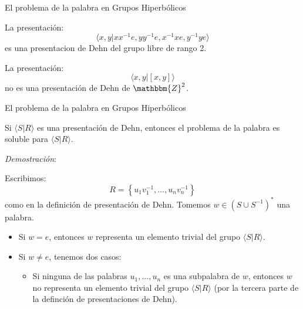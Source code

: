 \documentclass[xcolor=dvipsnames]{beamer}
\theoremstyle{largebreak}
\newcommand{\bbm}[1]{\ensuremath{\mathbbm{#1}}}
\newcommand{\gen}[1]{\ensuremath{\langle#1\rangle}}
\begin{document}
\begin{frame}{El problema de la palabra en Grupos Hiperbólicos}
    \begin{exa}
        La presentación:
        \begin{equation*}
            \gen{x,y|xx^{-1}e,yy^{-1}e,x^{-1}xe,y^{-1}ye}
        \end{equation*}
        es una presentacion de Dehn del grupo libre de rango 2.
    \end{exa}

    \begin{exa}
        La presentación:
        \begin{equation*}
            \gen{x,y|[x,y]}
        \end{equation*}
        no es una presentación de Dehn de $\bbm{Z}^2$.
    \end{exa}
\end{frame}

\begin{frame}{El problema de la palabra en Grupos Hiperbólicos}
    \begin{propo}
        Si $\gen{S|R}$ es una presentación de Dehn, entonces el problema de la palabra es soluble para $\gen{S|R}$.
    \end{propo}
    \textit{Demostración}:

    Escribimos:
    \begin{equation*}
        R=\left\{u_1v_1^{-1},...,u_nv_n^{-1} \right\}
    \end{equation*}
    como en la definición de presentación de Dehn. Tomemos $w\in(S\cup S^{-1})^*$ una palabra.
    \begin{itemize}
        \item Si $w=e$, entonces $w$ representa un elemento trivial del grupo $\gen{S|R}$.
        \item Si $w\neq e$, tenemos dos casos:
        \begin{itemize}
            \item Si ninguna de las palabras $u_1,...,u_n$ es una subpalabra de $w$, entonces $w$ no representa un elemento trivial del grupo $\gen{S|R}$ (por la tercera parte de la definción de presentaciones de Dehn).
        \end{itemize}
    \end{itemize}
\end{frame}
\end{document}
